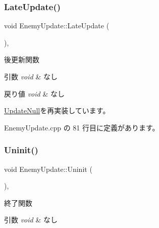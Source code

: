 \mbox{\label{class_enemy_update_ae14e4ebb42ad9043534e53edcba5b242}} 
\subsubsection{\texorpdfstring{Late\+Update()}{LateUpdate()}}
{\footnotesize\ttfamily void Enemy\+Update\+::\+Late\+Update (\begin{DoxyParamCaption}{ }\end{DoxyParamCaption})\hspace{0.3cm}{\ttfamily [override]}, {\ttfamily [virtual]}}



後更新関数 


\begin{DoxyParams}{引数}
{\em void} & なし \\
\hline
\end{DoxyParams}

\begin{DoxyRetVals}{戻り値}
{\em void} & なし \\
\hline
\end{DoxyRetVals}


\mbox{\hyperlink{class_update_null_ac68da1ba7f3fbcae833442bb1c169200}{Update\+Null}}を再実装しています。



 Enemy\+Update.\+cpp の 81 行目に定義があります。

\mbox{\label{class_enemy_update_a294a5d4c65551af43e933cb65036f279}} 
\subsubsection{\texorpdfstring{Uninit()}{Uninit()}}
{\footnotesize\ttfamily void Enemy\+Update\+::\+Uninit (\begin{DoxyParamCaption}{ }\end{DoxyParamCaption})\hspace{0.3cm}{\ttfamily [override]}, {\ttfamily [virtual]}}



終了関数 


\begin{DoxyParams}{引数}
{\em void} & なし \\
\hline
\end{DoxyParams}

